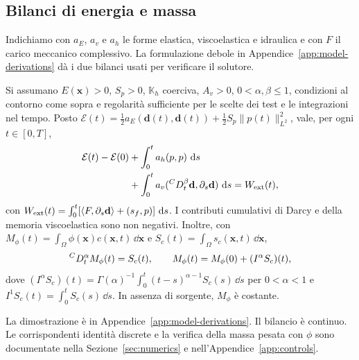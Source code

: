 \subsection{Bilanci di energia e massa}

Indichiamo con $a_E$, $a_v$ e $a_h$ le forme elastica, viscoelastica e idraulica e con $F$ il carico meccanico complessivo. La formulazione debole in Appendice~\ref{app:model-derivations} dà i due bilanci usati per verificare il solutore.

\begin{proposition}\label{prop:pv-bilanci}
Si assumano $E(\mathbf x)>0$, $S_p>0$, $\mathbb K_h$ coerciva,
$A_v>0$, $0<\alpha,\beta\le1$, condizioni al contorno come sopra
e regolarit\`a sufficiente per le scelte dei test e le integrazioni
nel tempo. Posto
$\mathcal E(t)=\tfrac12a_E(\mathbf d(t),\mathbf d(t))+
\tfrac12S_p\|p(t)\|_{L^2}^2$,
vale, per ogni $t\in[0,T]$,
\begin{equation}
\begin{aligned}
 \mathcal E(t)-\mathcal E(0)
 &+\int_0^t a_h(p,p)\,\,\mathrm{d} s\\
 &+\int_0^t a_v({}^{C}D_t^{\beta}\mathbf d,\partial_s\mathbf d)
       \,\,\mathrm{d} s
 =W_{\rm ext}(t),
\end{aligned}
\label{eq:energy}
\end{equation}
con
$W_{\rm ext}(t)=\int_0^t[\langle F,\partial_s\mathbf d\rangle+
(s_f,p)]\,\,\mathrm{d} s$.
I contributi cumulativi di Darcy e della memoria viscoelastica
sono non negativi. Inoltre, con
$M_\phi(t)=\int_\Omega\phi(\mathbf x)c(\mathbf x,t)\,\dd\mathbf x$
e $S_c(t)=\int_\Omega s_c(\mathbf x,t)\,\dd\mathbf x$,
\begin{equation}
 {}^{C}D_t^{\alpha} M_\phi(t)=S_c(t),\qquad
 M_\phi(t)=M_\phi(0)+(I^\alpha S_c)(t),
 \label{eq:mass}
\end{equation}
dove
$(I^\alpha S_c)(t)=\Gamma(\alpha)^{-1}
\int_0^t(t-s)^{\alpha-1}S_c(s)\,\dd s$ per $0<\alpha<1$
e $I^1S_c(t)=\int_0^tS_c(s)\,\dd s$.
In assenza di sorgente, $M_\phi$ \`e costante.

\end{proposition}

La dimostrazione è in Appendice~\ref{app:model-derivations}. Il bilancio è continuo. Le corrispondenti identità discrete e la verifica della massa pesata con $\phi$ sono documentate
nella Sezione~\ref{sec:numerics} e nell'Appendice~\ref{app:controls}.
